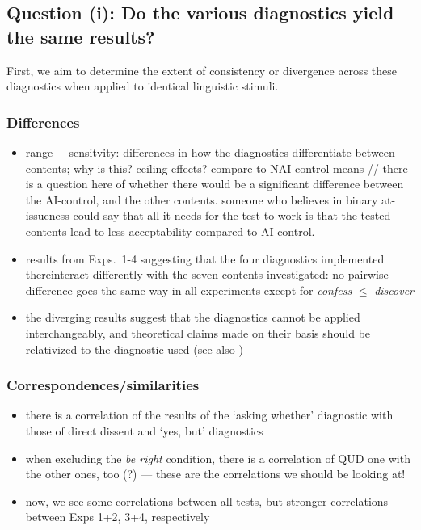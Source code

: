 \documentclass[times,linguex,xcolor]{glossa}
\begin{document}
  \subsection{Question (i): Do the various diagnostics yield the same results?}
    First, we aim to determine the extent of consistency or divergence across these diagnostics when applied to identical linguistic stimuli.

    \subsubsection{Differences}

      \begin{itemize}
        \item range + sensitvity: differences in how the diagnostics differentiate between contents; why is this? ceiling effects? compare to NAI control means // there is a question here of whether there would be a significant difference between the AI-control, and the other contents. someone who believes in binary at-issueness could say that all it needs for the test to work is that the tested contents lead to less acceptability compared to AI control.

        \item results from Exps.~1-4 suggesting that the four diagnostics implemented thereinteract differently with the seven contents investigated: no pairwise difference goes the same way in all experiments except for \emph{confess} $\leq$ \emph{discover}

        \item the diverging results suggest that the diagnostics cannot be applied  interchangeably, and theoretical claims made on their basis should be relativized to the diagnostic used (see also \citealt{snider_anaphoric_2017,snider_at-issuenessne_2017,snider_distinguishing_2018,koev_notions_2018,korotkova_evidential_2020})
      \end{itemize}

    \subsubsection{Correspondences/similarities}

      \begin{itemize}
        \item there is a correlation of the results of the `asking whether' diagnostic with those of direct dissent and `yes, but' diagnostics
        \item when excluding the \emph{be right} condition, there is a correlation of QUD one with the other ones, too (?) --- these are the correlations we should be looking at!
        \item now, we see some correlations between all tests, but stronger correlations between Exps 1+2, 3+4, respectively

      \end{itemize}
\end{document}
